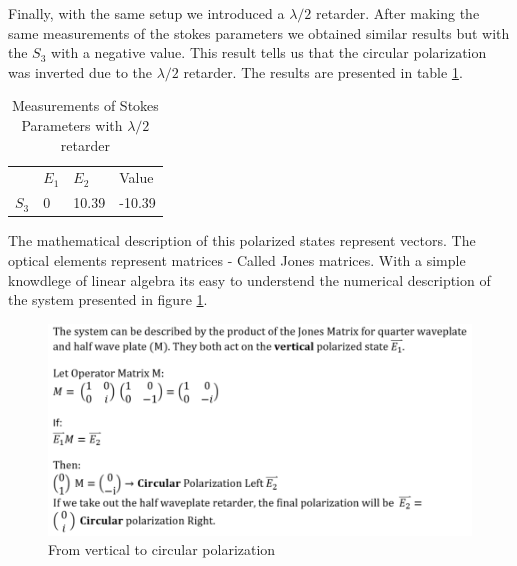 Finally, with the same setup we introduced a $\lambda/2$ retarder. After making the same measurements of the stokes parameters we obtained similar results but with the $S_3$ with a negative value. This result tells us that the circular polarization was inverted due to the  $\lambda/2$ retarder. The results are presented in table \ref{Tab:Stokes2}.
\begin{table}[H]
\begin{center}
\begin{tabular}{|l|l|l|l|}
      & $E_1$ & $E_2$ & Value \\
$S_3$ & 0 & 10.39  & -10.39       
\end{tabular}
\caption{Measurements of Stokes Parameters with $\lambda/2$ retarder}
\end{center}
\label{Tab:Stokes2}
\end{table}
The mathematical description of this polarized states represent vectors. The optical elements represent matrices - Called Jones matrices. With a simple knowdlege of linear algebra its easy to understend the numerical description of the system presented in figure \ref{fig:Proof}. 
\begin{figure}[H]
    \centering
    \includegraphics[scale=0.42]{Figures/Proof.png}
    \caption{From vertical to circular polarization}
    \label{fig:Proof}
\end{figure}